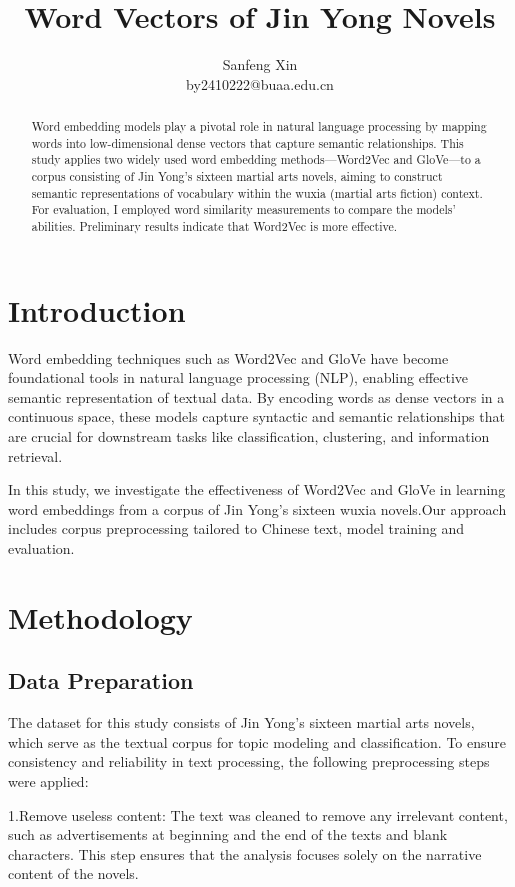 \documentclass[12pt]{article}
\title{\fontsize{14}{16}\bfseries Word Vectors of Jin Yong Novels}
\author{\small Sanfeng Xin\\ \small by2410222@buaa.edu.cn}
\date{}
\begin{document}
\maketitle
\renewcommand{\abstractname}{\textbf{\Large Abstract}} %
\begin{abstract}
Word embedding models play a pivotal role in natural language processing by mapping words into low-dimensional dense vectors that capture semantic relationships. This study applies two widely used word embedding methods—Word2Vec and GloVe—to a corpus consisting of Jin Yong’s sixteen martial arts novels, aiming to construct semantic representations of vocabulary within the wuxia (martial arts fiction) context. For evaluation, I employed word similarity measurements to compare the models’ abilities. Preliminary results indicate that Word2Vec is more effective.
\end{abstract}

\section*{\centering Introduction}
Word embedding techniques such as Word2Vec and GloVe have become foundational tools in natural language processing (NLP), enabling effective semantic representation of textual data. By encoding words as dense vectors in a continuous space, these models capture syntactic and semantic relationships that are crucial for downstream tasks like classification, clustering, and information retrieval.

In this study, we investigate the effectiveness of Word2Vec and GloVe in learning word embeddings from a corpus of Jin Yong’s sixteen wuxia novels.Our approach includes corpus preprocessing tailored to Chinese text, model training and evaluation.
\section*{\centering Methodology}

\subsection*{\centering Data Preparation}
The dataset for this study consists of Jin Yong's sixteen martial arts novels, which serve as the textual corpus for topic modeling and classification. To ensure consistency and reliability in text processing, the following preprocessing steps were applied:

1.Remove useless content: The text was cleaned to remove any irrelevant content, such as advertisements at beginning and the end of the texts and blank characters. This step ensures that the analysis focuses solely on the narrative content of the novels.
\end{document}
